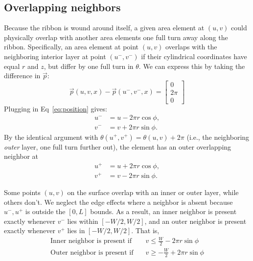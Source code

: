 \documentclass[11pt]{article}
\begin{document}
\subsection{Overlapping neighbors}\label{sec:neighbors}
Because the ribbon is wound around itself, a given area element at $(u,v)$ could physically overlap with another area elements one full turn away along the ribbon. Specifically, an area element at point $(u,v)$ overlaps with the neighboring interior layer at point $(u^-,v^-)$ if their cylindrical coordinates have equal $r$ and $z$, but differ by one full turn in $\theta$. We can express this by taking the difference in $\vec{p}$:
\begin{equation}
    \vec{p}(u,v,x) - \vec{p}(u^-,v^-,x) = \begin{bmatrix}
        0\\
        2\pi\\
        0
    \end{bmatrix}
\end{equation}
Plugging in Eq~\eqref{eq:position} gives:
\begin{align}
    u^- &= u - 2\pi r \cos \phi,\label{eq:uminus}\\
    v^- &= v + 2\pi r \sin \phi.\label{eq:vminus}
\end{align}
By the identical argument with $\theta(u^+,v^+)=\theta(u,v)+2\pi$ (i.e., the neighboring \emph{outer} layer, one full turn further out), the element has an outer overlapping neighbor at
\begin{align}
    u^+ &= u + 2\pi r \cos \phi,\label{eq:uplus}\\
    v^+ &= v - 2\pi r \sin \phi.\label{eq:vplus}
\end{align}

Some points $(u,v)$ on the surface overlap with an inner or outer layer, while others don't. We neglect the edge effects where a neighbor is absent because $u^-,u^+$ is outside the $[0,L]$ bounds. As a result, an inner neighbor is present exactly whenever $v^-$ lies within $[-W/2,W/2]$, and an outer neighbor is present exactly whenever $v^+$ lies in $[-W/2,W/2]$. That is,
\begin{align}
    \text{Inner neighbor is present if}&\quad v\le \frac{W}{2}-2\pi r \sin\phi\\
    \text{Outer neighbor is present if}&\quad v\ge -\frac{W}{2}+2\pi r \sin\phi
\end{align}
\end{document}
